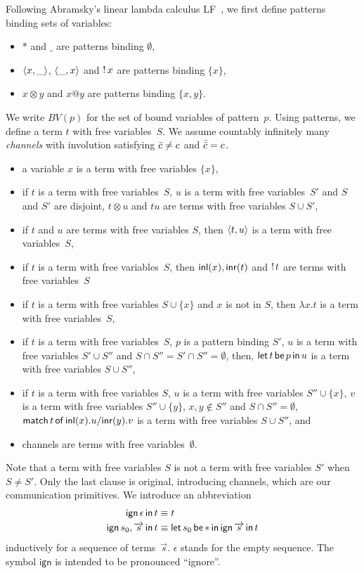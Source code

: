 Following Abramsky's linear lambda calculus
LF~\citep{abramsky1993computational}, we first define patterns
binding sets of variables:
\begin{itemize}
 \item $\ast$ and $\_$ are patterns binding $\emptyset$,
 \item $\langle{x,\_}\rangle$, $\langle{\_,x}\rangle$ and $\mathop{!} x$ are patterns binding
       $\{x\}$,
 \item $x\otimes y$ and $x@y$ are patterns binding $\{x,y\}$.
\end{itemize}
We write $BV(p)$ for the set of bound variables of pattern~$p$.
Using patterns, we define a term $t$ with free variables~$S$.
We assume countably infinitely many \textit{channels}
with involution
satisfying $\bar{c}\neq c$ and $\bar{\bar{c}} = c$.
\begin{itemize}
 \item a variable $x$ is a term with free variables $\{x\}$,
 \item if $t$ is a term with free variables~$S$, $u$ is a term with
       free variables~$S'$ and $S$ and $S'$ are disjoint, $t\otimes u$ and
       $tu$ are terms with free variables $S\cup S'$,
 \item if $t$ and $u$ are terms with free variables $S$, then
       $\langle{t,u}\rangle$ is a term with free variables~$S$,
 \item if $t$ is a term with free variables~$S$, then
       $\mathsf{inl}({x}), \mathsf{inr}({t})$ and $\mathop{!} t$ are terms with free variables~$S$
 \item if $t$ is a term with free variables $S\cup \{x\}$ and $x$ is not
       in $S$, then $\lambda x.t$ is a term with free variables~$S$,
 \item if $t$ is a term with free variables~$S$, $p$ is a pattern
       binding $S'$, $u$ is a term with free variables $S'\cup S''$ and
       $S\cap S'' = S'\cap S'' = \emptyset$, then,
       $\mathsf{let }\,{t}\,\mathsf{ be }\,{p}\,\mathsf{ in }\,{u}$ is a term with free variables $S\cup S''$,
 \item if $t$ is a term with free variables $S$,
       $u$ is a term with free variables $S''\cup \{x\}$,
       $v$ is a term with free variables $S''\cup \{y\}$,
       $x,y\notin S''$ and $S\cap S'' = \emptyset$,
       $\mathsf{match}\,{t}\,\mathsf{of}\, \mathsf{inl}({x}). {u}/ \mathsf{inr}({y}). {v}$ is a term with free variables $S\cup S''$, and
 \item channels are terms with free variables~$\emptyset$.
\end{itemize}
Note that a term with free variables $S$ is not a term with free
variables $S'$ when $S\neq S'$.  Only the last clause is original,
introducing channels, which are our communication primitives.
We introduce an abbreviation
\begin{align*}
 \mathsf{ign }\,{\epsilon}\,\mathsf{ in }\,{t}   & \equiv t\\
 \mathsf{ign }\,{s_0,\overrightarrow s}\,\mathsf{ in }\,{t} & \equiv \mathsf{let }\,{s_0}\,\mathsf{ be }\,{\ast}\,\mathsf{ in }\,{\mathsf{ign }\,{\overrightarrow s}\,\mathsf{ in }\,{t}}
\end{align*}
inductively for a sequence of terms~$\vec s$.
$\epsilon$ stands for the empty sequence.
The symbol $\mathsf{ign}$ is intended to be pronounced ``ignore''.

